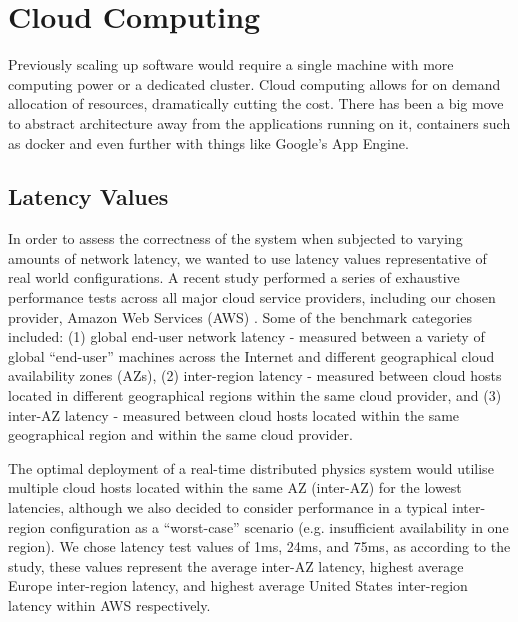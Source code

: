 \section{Cloud Computing}

Previously scaling up software would require a single machine with more computing power or a dedicated cluster. Cloud computing allows for on demand allocation of resources, dramatically cutting the cost. There has been a big move to abstract architecture away from the applications running on it, containers such as docker and even further with things like Google's App Engine.

\subsection{Latency Values}

In order to assess the correctness of the system when subjected to varying amounts of network latency, we wanted to use latency values representative of real world configurations. A recent study performed a series of exhaustive performance tests across all major cloud service providers, including our chosen provider, Amazon Web Services (AWS) \cite{ThousandEyesCloudPerf2019}. Some of the benchmark categories included: (1) global end-user network latency - measured between a variety of global ``end-user'' machines across the Internet and different geographical cloud availability zones (AZs), (2) inter-region latency - measured between cloud hosts located in different geographical regions within the same cloud provider, and (3) inter-AZ latency - measured between cloud hosts located within the same geographical region and within the same cloud provider.

The optimal deployment of a real-time distributed physics system would utilise multiple cloud hosts located within the same AZ (inter-AZ) for the lowest latencies, although we also decided to consider performance in a typical inter-region configuration as a ``worst-case'' scenario (e.g. insufficient availability in one region). We chose latency test values of 1ms, 24ms, and 75ms, as according to the study, these values represent the average inter-AZ latency, highest average Europe inter-region latency, and highest average United States inter-region latency within AWS respectively.

